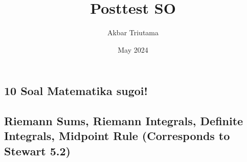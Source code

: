 \documentclass{article}
\title{Posttest SO}
\author{Akbar Triutama}
\date{May 2024}
\begin{document}
\maketitle{}

\begin{center}
    \section*{10 Soal Matematika sugoi!}
\end{center} \vspace{2em}

\subsection*{Riemann Sums, Riemann Integrals, Definite Integrals, Midpoint Rule (Corresponds to Stewart 5.2)} \vspace{2em}
\end{document}
